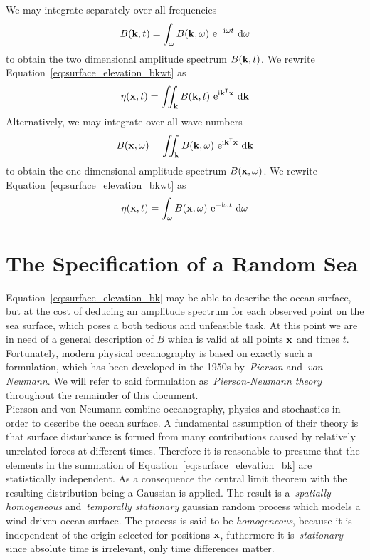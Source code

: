 We may integrate separately over all frequencies
%
\begin{equation}
 B(\mathbf{k}, t) = \int_{\omega} B(\mathbf{k},
\omega)~\mathrm{e}^{-\mathrm{i}\omega t}~\mathrm{d}\omega
\end{equation}
to obtain the two dimensional amplitude spectrum $B(\mathbf{k}, t)$. We rewrite
Equation~\ref{eq:surface_elevation_bkwt} as
\begin{equation}
\label{eq:surface_elevation_bk}
 \eta(\mathbf{x}, t) = \iint_{\mathbf{k}} B(\mathbf{k},t)
~\mathrm{e}^{\mathrm{i}\mathbf{k}^{\mathsf{T}}\mathbf{x}}~
\mathrm{d}\mathbf{k}
\end{equation}
%
Alternatively, we may integrate over all wave numbers
\begin{equation}
 B(\mathbf{x}, \omega) = \iint_{\mathbf{k}} B(\mathbf{k},
\omega)~\mathrm{e}^{\mathrm{i}\mathbf{k}^{\mathsf{T}}\mathbf{x}}~\mathrm{d}\mathbf{k}
\end{equation}
%
to obtain the one dimensional amplitude spectrum $B(\mathbf{x}, \omega)$. We
rewrite Equation~\ref{eq:surface_elevation_bkwt} as
\begin{equation}
\label{eq:surface_elevation_bw}
\eta(\mathbf{x}, t) = \int_{\omega} B(\mathbf{x},\omega)
~\mathrm{e}^{-\mathrm{i}\omega t}~\mathrm{d}\omega
\end{equation}
%
\section{The Specification of a Random Sea}
\label{sec:random_sea}
%
Equation~\ref{eq:surface_elevation_bk} may be able to describe the ocean
surface, but at the cost of deducing an amplitude spectrum for each observed
point on the sea surface, which poses a both tedious and unfeasible task. At
this point we are in need of a general description of $B$ which is valid at all
points $\mathbf{x}$ and times $t$. Fortunately, modern physical oceanography is
based on exactly such a formulation, which has been developed in the 1950s
by~\emph{Pierson} and~\emph{von Neumann}.  We will refer to
said formulation as~\emph{Pierson-Neumann theory} throughout the remainder of
this document.\\

Pierson and von Neumann combine oceanography, physics and stochastics in order
to describe the ocean surface. A fundamental assumption of their theory is that
surface disturbance is formed from many contributions caused by relatively
unrelated forces at different times. Therefore it is reasonable to presume that
the elements in the summation of Equation~\ref{eq:surface_elevation_bk} are
statistically independent. As a consequence the central limit theorem with the
resulting distribution being a Gaussian is applied. The result is
a~\emph{spatially homogeneous} and~\emph{temporally stationary} gaussian random
process which models a wind driven ocean surface. The process is said to be
\emph{homogeneous}, because it is independent of the origin selected for
positions $\mathbf{x}$, futhermore it is~\emph{stationary} since absolute time is
irrelevant, only time differences matter.
%
